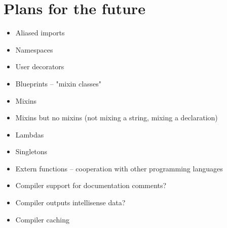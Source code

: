 \chapter{Plans for the future}
\begin{itemize}
	\item Aliased imports
	\item Namespaces
	\item User decorators
	\item Blueprints -- "mixin classes"
	\item Mixins
	\item Mixins but no mixins (not mixing a string, mixing a declaration)
	\item Lambdas
	\item Singletons
	\item Extern functions -- cooperation with other programming languages
	\item Compiler support for documentation comments?
	\item Compiler outputs intellisense data?
	\item Compiler caching
\end{itemize}

          
